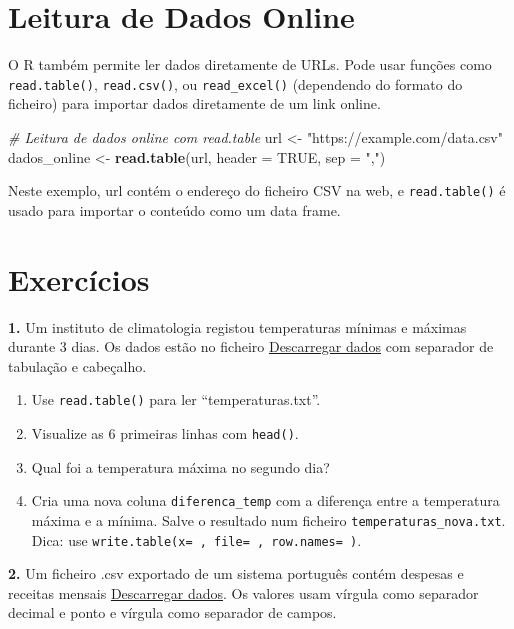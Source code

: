 \documentclass[
]{book}
\newenvironment{Shaded}{\begin{snugshade}}{\end{snugshade}}
\newcommand{\AttributeTok}[1]{\textcolor[rgb]{0.13,0.29,0.53}{#1}}
\newcommand{\CommentTok}[1]{\textcolor[rgb]{0.56,0.35,0.01}{\textit{#1}}}
\newcommand{\ConstantTok}[1]{\textcolor[rgb]{0.56,0.35,0.01}{#1}}
\newcommand{\FunctionTok}[1]{\textcolor[rgb]{0.13,0.29,0.53}{\textbf{#1}}}
\newcommand{\NormalTok}[1]{#1}
\newcommand{\OtherTok}[1]{\textcolor[rgb]{0.56,0.35,0.01}{#1}}
\newcommand{\StringTok}[1]{\textcolor[rgb]{0.31,0.60,0.02}{#1}}
\begin{document}
\section{Leitura de Dados Online}\label{leitura-de-dados-online}

O R também permite ler dados diretamente de URLs. Pode usar funções como
\texttt{read.table()}, \texttt{read.csv()}, ou \texttt{read\_excel()} (dependendo do formato
do ficheiro) para importar dados diretamente de um link online.

\begin{Shaded}
\begin{Highlighting}[]
\CommentTok{\# Leitura de dados online com read.table}
\NormalTok{url }\OtherTok{\textless{}{-}} \StringTok{"https://example.com/data.csv"}
\NormalTok{dados\_online }\OtherTok{\textless{}{-}} \FunctionTok{read.table}\NormalTok{(url, }\AttributeTok{header =} \ConstantTok{TRUE}\NormalTok{, }\AttributeTok{sep =} \StringTok{","}\NormalTok{)}
\end{Highlighting}
\end{Shaded}

Neste exemplo, url contém o endereço do ficheiro CSV na web, e
\texttt{read.table()} é usado para importar o conteúdo como um data frame.

\section{Exercícios}\label{exercuxedcios-9}

\textbf{1.} Um instituto de climatologia registou temperaturas mínimas e máximas durante 3 dias. Os dados estão no ficheiro \href{docs/temperaturas.txt}{Descarregar dados} com separador de tabulação e cabeçalho.

\begin{enumerate}
\def\labelenumi{(\alph{enumi})}
\item
  Use \texttt{read.table()} para ler ``temperaturas.txt''.
\item
  Visualize as 6 primeiras linhas com \texttt{head()}.
\item
  Qual foi a temperatura máxima no segundo dia?
\item
  Cria uma nova coluna \texttt{diferenca\_temp} com a diferença entre a temperatura máxima e a mínima. Salve o resultado num ficheiro \texttt{temperaturas\_nova.txt}. Dica: use \texttt{write.table(x=\ ,\ file=\ ,\ row.names=\ )}.
\end{enumerate}

\textbf{2.} Um ficheiro .csv exportado de um sistema português contém despesas e receitas mensais \href{docs/financas.csv}{Descarregar dados}. Os valores usam vírgula como separador decimal e ponto e vírgula como separador de campos.
\end{document}
